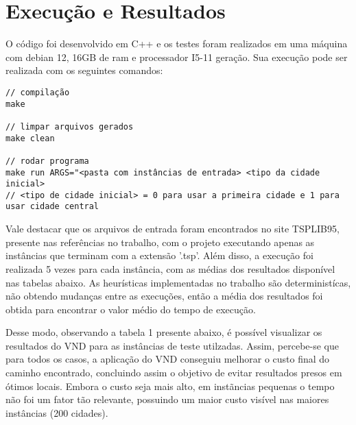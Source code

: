 \documentclass[10pt]{extarticle} %
\begin{document}
\section{Execução e Resultados}

O código foi desenvolvido em C++ e os testes foram realizados em uma máquina com debian 12, 16GB de ram e processador I5-11 geração. Sua execução pode ser realizada com os seguintes comandos:

\begin{verbatim}
// compilação
make

// limpar arquivos gerados
make clean

// rodar programa
make run ARGS="<pasta com instâncias de entrada> <tipo da cidade inicial>
// <tipo de cidade inicial> = 0 para usar a primeira cidade e 1 para usar cidade central
\end{verbatim}

Vale destacar que os arquivos de entrada foram encontrados no site TSPLIB95, presente nas referências no trabalho, com o projeto executando apenas as instâncias que terminam com a extensão '.tsp'. Além disso, a execução foi realizada 5 vezes para cada instância, com as médias dos resultados disponível nas tabelas abaixo. As heurísticas implementadas no trabalho são deterministícas, não obtendo mudanças entre as execuções, então a média dos resultados foi obtida para encontrar o valor médio do tempo de execução.

Desse modo, observando a tabela 1 presente abaixo, é possível visualizar os resultados do VND para as instâncias de teste utilzadas. Assim, percebe-se que para todos os casos, a aplicação do VND conseguiu melhorar o custo final do caminho encontrado, concluindo assim o objetivo de evitar resultados presos em ótimos locais. Embora o custo seja mais alto, em instãncias pequenas o tempo não foi um fator tão relevante, possuindo um maior custo visível nas maiores instâncias (200 cidades).
\end{document}
